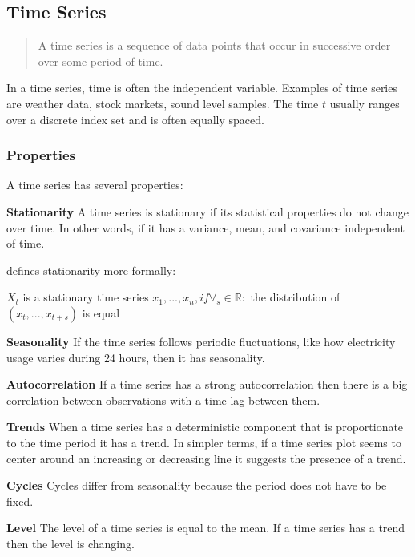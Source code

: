 \subsection{Time Series}
\label{sec:time-series}
\begin{quote}
    A time series is a sequence of data
    points that occur in successive order over some period of time.
\end{quote}
\cite{Hayes}

In a time series, time is often the independent variable.
Examples of time series are weather data, stock markets, sound level samples.
The time $t$ usually ranges over a discrete index set and is often equally spaced.

\subsubsection{Properties}
A time series has several properties:


\textbf{Stationarity}
A time series is stationary if its statistical properties do not change over time.
In other words, if it has a variance, mean, and covariance independent of time.

\cite{RobJHyndman2014} defines stationarity more formally:
\begin{definition}
   $X_t$ is a stationary time series 
   $x_1, ..., x_n, if \forall_s \in \mathbb{R} :$
   the distribution of $(x_t, ..., x_{t+s})$ is equal
\end{definition}

\textbf{Seasonality}
If the time series follows periodic fluctuations, like how electricity usage varies during 24 hours,
then it has seasonality.

\textbf{Autocorrelation}
If a time series has a strong autocorrelation then there is a big
correlation between observations with a time lag between them.

\textbf{Trends}
When a time series has a deterministic component that is proportionate to the time period it has a trend.
In simpler terms, if a time series plot seems to center around an increasing or decreasing line it suggests the presence of a trend.

\textbf{Cycles}
Cycles differ from seasonality because the period does not have to be fixed.


\textbf{Level}
The level of a time series is equal to the mean. If a time series has a trend
then the level is changing.







